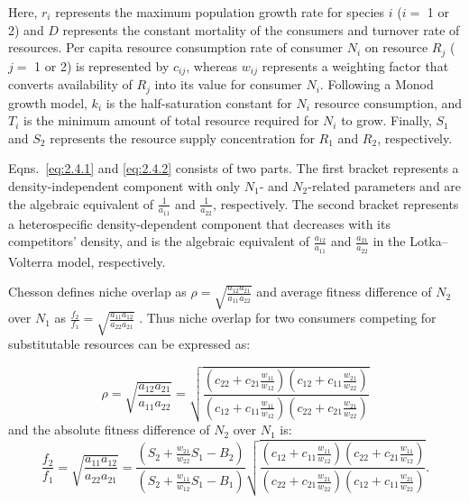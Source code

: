 \begin{infobox}
\noindent Here, $r_{i}$ represents the maximum population growth rate for species $i$ ($i = $ 1 or 2) and $D$ represents the constant mortality of the consumers and turnover rate of resources. Per capita resource consumption rate of consumer $N_{i}$ on resource $R_{j}$ ($j = $ 1 or 2) is represented by $c_{ij}$, whereas $w_{ij}$ represents a weighting factor that converts availability of $R_{j}$ into its value for consumer $N_{i}$. Following a Monod growth model, $k_{i}$ is the half-saturation constant for $N_{i}$ resource consumption, and $T_{i}$ is the minimum amount of total resource required for $N_{i}$ to grow. Finally, $S_{1}$ and $S_{2}$ represents the resource supply concentration for $R_{1}$ and $R_{2}$, respectively.
\par


Eqns.~\ref{eq:2.4.1} and \ref{eq:2.4.2} consists of two parts. The first bracket represents a density-independent component with only $N_{1}$- and $N_{2}$-related parameters and are the algebraic equivalent of $\frac{1}{a_{11}}$ and $\frac{1}{a_{22}}$, respectively. The second bracket represents a heterospecific density-dependent component that decreases with its competitors' density, and is the algebraic equivalent of $\frac{a_{12}}{a_{11}}$ and $\frac{a_{21}}{a_{22}}$ in the Lotka--Volterra model, respectively.
\par


Chesson defines niche overlap as $\rho=\sqrt {\frac{{{a_{12}}{a_{21}}}}{{{a_{11}}{a_{22}}}}}$ and average fitness difference of $N_{2}$ over $N_{1}$ as $\frac{{{f_2}}}{{{f_1}}} = \sqrt {\frac{{{a_{11}}{a_{12}}}}{{{a_{22}}{a_{21}}}}}$ \citep{Chesson2008b, Chesson2013ecosys}. Thus niche overlap for two consumers competing for substitutable resources can be expressed as:

\begin{equation}
\rho  = \sqrt {\frac{{{a_{12}}{a_{21}}}}{{{a_{11}}{a_{22}}}}}  = \sqrt {\frac{\left (
		c_{22} + c_{21}\frac{w_{11}}{w_{12}}\right )\left ( 
		c_{12} + c_{11}\frac{w_{21}}{w_{22}} \right )}{\left (
		c_{12} + c_{11}\frac{w_{11}}{w_{12}}\right )\left ( 
		c_{22} + c_{21}\frac{w_{21}}{w_{22}} \right )}} 
\tag{2.5.1}\label{eq:2.5.1}
\end{equation}
and the absolute fitness difference of $N_{2}$ over $N_{1}$ is:
\begin{equation}
\frac{{{f_2}}}{{{f_1}}} = \sqrt {\frac{{{a_{11}}{a_{12}}}}{{{a_{22}}{a_{21}}}}}  = \frac{\left (S_{2}+\frac{w_{21}}{w_{22}}S_{1}-B_{2}\right )}{\left (S_{2}+\frac{w_{11}}{w_{12}}S_{1}-B_{1}\right )}\sqrt {\frac{\left (
		c_{12} + c_{11}\frac{w_{11}}{w_{12}}\right )\left ( 
		c_{22} + c_{21}\frac{w_{11}}{w_{12}} \right )}{\left (
		c_{22} + c_{21}\frac{w_{21}}{w_{22}}\right )\left ( 
		c_{12} + c_{11}\frac{w_{21}}{w_{22}} \right )}}.
\tag{2.5.2}\label{eq:2.5.2}
\end{equation}
\end{infobox}



